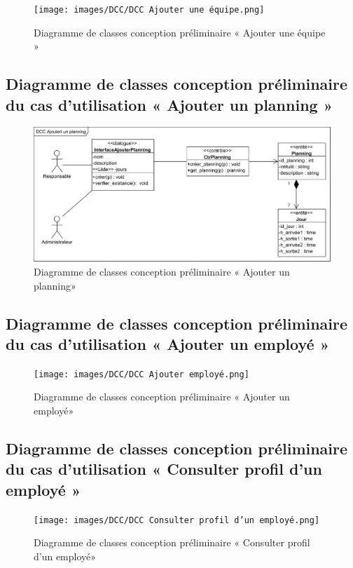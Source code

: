 \begin{figure}[h!]
    \centering
    \texttt{[image: images/DCC/DCC Ajouter une équipe.png]}
    \caption{Diagramme de classes conception préliminaire « Ajouter une équipe »}
    \label{fig43}
\end{figure}
        
\subsection*{Diagramme de classes conception préliminaire du cas d'utilisation « Ajouter un planning »}

\begin{figure}[h!]
    \centering
    \includegraphics[scale=0.7]{images/DCC/DCC Ajoutert un planning.png}
    \caption{Diagramme de classes conception préliminaire « Ajouter un planning»}
    \label{fig44}
\end{figure}
        
\clearpage

\subsection*{Diagramme de classes conception préliminaire du cas d'utilisation « Ajouter un employé »}

\begin{figure}[h!]
    \centering
    \texttt{[image: images/DCC/DCC Ajouter employé.png]}
    \caption{Diagramme de classes conception préliminaire « Ajouter un employé»}
    \label{fig45}
\end{figure}

\subsection*{Diagramme de classes conception préliminaire du cas d'utilisation « Consulter profil d'un employé »}

\begin{figure}[h!]
    \centering
    \texttt{[image: images/DCC/DCC Consulter profil d'un employé.png]}
    \caption{Diagramme de classes conception préliminaire « Consulter profil d'un employé»}
    \label{fig46}
\end{figure}

